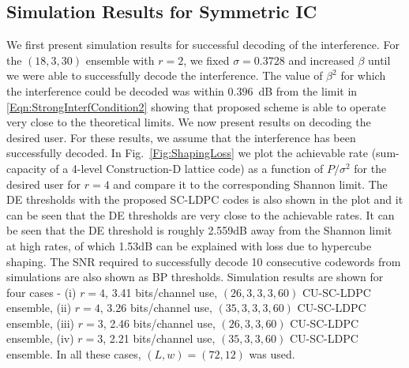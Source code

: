 \documentclass[conference]{IEEEtran}
\begin{document}



\subsection{Simulation Results for Symmetric IC}
We first present simulation results for successful decoding of the interference. For the $(18,3,30)$ ensemble with $r=2$, we fixed $\sigma = 0.3728$ and increased $\beta$ until we were able to successfully decode the interference. The value of $\beta^2$ for which the interference could be decoded was within $0.396$~dB from the limit in  \eqref{Eqn:StrongInterfCondition2} showing that proposed scheme is able to operate very close to the theoretical limits. We now present results on decoding the desired user. For these results, we assume that the interference has been successfully decoded. In Fig.~\ref{Fig:ShapingLoss} we plot the achievable rate (sum-capacity of a 4-level Construction-D lattice code) as a function of $P/\sigma^2$ for the desired user for $r=4$ and compare it to the corresponding Shannon limit.  The DE thresholds with the proposed SC-LDPC codes is also shown in the plot and it can be seen that the DE thresholds are very close to the achievable rates. It can be seen that the DE threshold is roughly 2.559dB away from the Shannon limit at high rates, of which 1.53dB  can be explained with loss due to hypercube shaping. The SNR required to successfully decode 10 consecutive codewords from simulations are also shown as BP thresholds. Simulation results are shown for four cases - (i) $r=4$, 3.41 bits/channel use, $(26,3,3,3,60)$ CU-SC-LDPC ensemble, (ii) $r=4$, 3.26 bits/channel use, $(35,3,3,3,60)$ CU-SC-LDPC ensemble, (iii) $r=3$, 2.46 bits/channel use, $(26,3,3,60)$ CU-SC-LDPC ensemble, (iv) $r=3$, 2.21 bits/channel use, $(35,3,3,60)$ CU-SC-LDPC ensemble. In all these cases, $(L,w)=(72,12)$ was used.%
\end{document}
